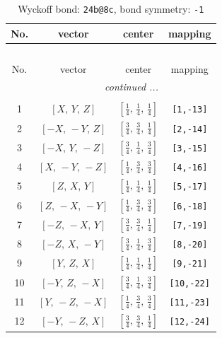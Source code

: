 \documentclass[fleqn,8pt]{jsarticle}
\begin{document}
\begin{longtable}{cccc}
\caption{Wyckoff bond: {\tt 24b@8c}, bond symmetry: {\tt -1}}
 \\
 \hline \hline
No. & vector & center & mapping \\ \hline \endfirsthead

\multicolumn{3}{l}{\tablename\ \thetable{}} \\
 \hline \hline
No. & vector & center & mapping \\ \hline \endhead

 \hline \hline
\multicolumn{3}{r}{\footnotesize\it continued ...} \\ \endfoot

 \hline \hline
\multicolumn{3}{r}{} \\ \endlastfoot

1 & $\left[ X,\, Y,\, Z \right]$ & $\left[ \frac{1}{4},\, \frac{1}{4},\, \frac{1}{4} \right]$ & {\tt [1,-13]} \\ \hline
2 & $\left[ - X,\, - Y,\, Z \right]$ & $\left[ \frac{3}{4},\, \frac{3}{4},\, \frac{1}{4} \right]$ & {\tt [2,-14]} \\ \hline
3 & $\left[ - X,\, Y,\, - Z \right]$ & $\left[ \frac{3}{4},\, \frac{1}{4},\, \frac{3}{4} \right]$ & {\tt [3,-15]} \\ \hline
4 & $\left[ X,\, - Y,\, - Z \right]$ & $\left[ \frac{1}{4},\, \frac{3}{4},\, \frac{3}{4} \right]$ & {\tt [4,-16]} \\ \hline
5 & $\left[ Z,\, X,\, Y \right]$ & $\left[ \frac{1}{4},\, \frac{1}{4},\, \frac{1}{4} \right]$ & {\tt [5,-17]} \\ \hline
6 & $\left[ Z,\, - X,\, - Y \right]$ & $\left[ \frac{1}{4},\, \frac{3}{4},\, \frac{3}{4} \right]$ & {\tt [6,-18]} \\ \hline
7 & $\left[ - Z,\, - X,\, Y \right]$ & $\left[ \frac{3}{4},\, \frac{3}{4},\, \frac{1}{4} \right]$ & {\tt [7,-19]} \\ \hline
8 & $\left[ - Z,\, X,\, - Y \right]$ & $\left[ \frac{3}{4},\, \frac{1}{4},\, \frac{3}{4} \right]$ & {\tt [8,-20]} \\ \hline
9 & $\left[ Y,\, Z,\, X \right]$ & $\left[ \frac{1}{4},\, \frac{1}{4},\, \frac{1}{4} \right]$ & {\tt [9,-21]} \\ \hline
10 & $\left[ - Y,\, Z,\, - X \right]$ & $\left[ \frac{3}{4},\, \frac{1}{4},\, \frac{3}{4} \right]$ & {\tt [10,-22]} \\ \hline
11 & $\left[ Y,\, - Z,\, - X \right]$ & $\left[ \frac{1}{4},\, \frac{3}{4},\, \frac{3}{4} \right]$ & {\tt [11,-23]} \\ \hline
12 & $\left[ - Y,\, - Z,\, X \right]$ & $\left[ \frac{3}{4},\, \frac{3}{4},\, \frac{1}{4} \right]$ & {\tt [12,-24]} \\
\end{longtable}
\end{document}
